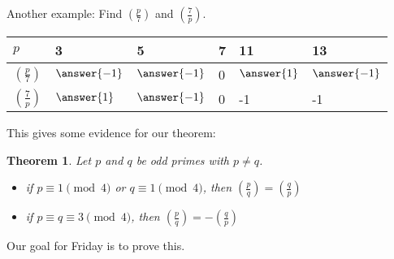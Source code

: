 \documentclass{ximera}
\theoremstyle{plain}
\newtheorem{thm}{Theorem}
\begin{document}
\begin{question}
 Another example: Find $\left(\frac{p}{7}\right)$ and $\left(\frac{7}{p}\right)$.
 
\begin{tabular}{|l||l|l|l|l|l|}\hline
$p$&3&5&7&11&13\\\hline\hline
$\left(\frac{p}{7}\right)$&$\answer{-1}$&$\answer{-1}$&0&$\answer{1}$&$\answer{-1}$\\\hline
$\left(\frac{7}{p}\right)$&$\answer{1}$&$\answer{-1}$&0&-1&-1\\\hline
\end{tabular}
\end{question}

This gives some evidence for our theorem:
\begin{thm}
 Let $p$ and $q$ be odd primes with $p\neq q$. 
\begin{itemize}
 \item if $p\equiv 1 \pmod 4$ or $q\equiv 1 \pmod 4$, then $\left(\frac{p}{q}\right)=\left(\frac{q}{p}\right)$
 \item if $p\equiv q\equiv 3 \pmod 4$, then $\left(\frac{p}{q}\right)=-\left(\frac{q}{p}\right)$
\end{itemize}
\end{thm}

Our goal for Friday is to prove this.
\end{document}

